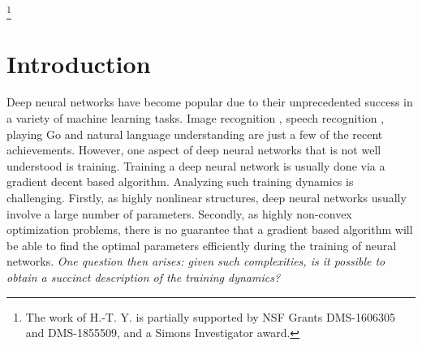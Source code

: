 \documentclass{article}
\numberwithin{equation}{section}
\newcommand{\cob}{\color{darkblue}}
\newcommand{\nc}{\normalcolor}
\newcommand{\1}{\mathds{1}}
\theoremstyle{plain} %
\begin{document}
\let\thefootnote\relax\footnote{\noindent The work of H.-T. Y. is partially supported by NSF Grants DMS-1606305 and DMS-1855509, and a Simons Investigator award.}

\section{Introduction}


Deep neural networks have become popular due to their unprecedented success in a variety of machine learning tasks. Image recognition \cite{lecun1998gradient, krizhevsky2012imagenet, szegedy2015going},  
speech recognition \cite{hinton2012deep,sainath2013deep}, playing Go \cite{silver2016mastering,silver2017mastering} and natural language understanding \cite{collobert2011natural, wu2016google, devlin2018bert} are just a few of the recent achievements. %
However, one aspect of deep neural networks that  is  not  well understood is training. Training a deep neural network is usually done via a gradient decent  based algorithm. Analyzing such training dynamics is challenging. Firstly, as highly nonlinear structures, deep neural networks usually involve a large number of parameters. Secondly, as highly non-convex optimization problems, there is no guarantee that a gradient based algorithm will be able to find the optimal parameters efficiently during the training of neural networks. \emph{One question then arises: given such complexities, is it possible to obtain a succinct description of the training dynamics?}
\end{document}
